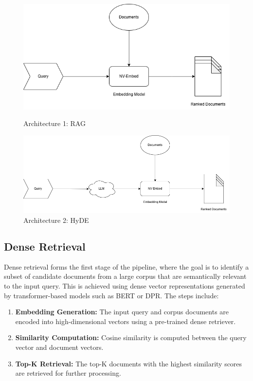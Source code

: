 \begin{figure}[ht]
    \centering
    \begin{minipage}[t]{0.48\textwidth}
        \centering
        \includegraphics[width=\linewidth]{IMAGE/RAG_archi.png}
        \caption{Architecture 1: RAG}
        \label{fig:system_architecture}
    \end{minipage}
    \hfill
    \begin{minipage}[t]{0.48\textwidth}
        \centering
        \includegraphics[width=\linewidth]{IMAGE/RAG_HyDE_archi.png}
        \caption{Architecture 2: HyDE}
        \label{fig:system_architecture}
    \end{minipage}
\end{figure}

\subsection{Dense Retrieval}
Dense retrieval forms the first stage of the pipeline, where the goal is to identify a subset of candidate documents from a large corpus that are semantically relevant to the input query. This is achieved using dense vector representations generated by transformer-based models such as BERT or DPR. The steps include:
\begin{enumerate}
    \item \textbf{Embedding Generation:} The input query and corpus documents are encoded into high-dimensional vectors using a pre-trained dense retriever.
    \item \textbf{Similarity Computation:} Cosine similarity is computed between the query vector and document vectors.
    \item \textbf{Top-K Retrieval:} The top-K documents with the highest similarity scores are retrieved for further processing.
\end{enumerate}


